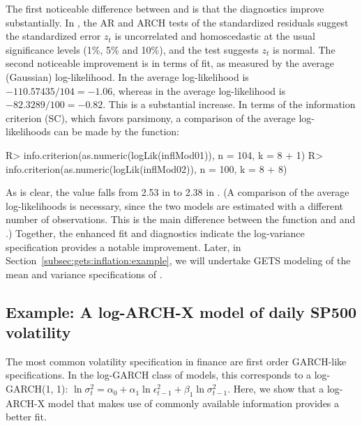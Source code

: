 \documentclass[article,nojss]{jss}
\begin{document}
%
The first noticeable difference between  and
 is that the diagnostics improve substantially. In
, the AR and ARCH tests of the standardized residuals
suggest the standardized error $z_t$ is uncorrelated and homoscedastic
at the usual significance levels (1\%, 5\% and 10\%), and the
\cite{JarqueBera1980} test suggests $z_t$ is normal. The second
noticeable improvement is in terms of fit, as measured by the average
(Gaussian) log-likelihood. In  the average
log-likelihood is $-110.57435/104= -1.06$, whereas in 
the average log-likelihood is $-82.3289/100= -0.82$. This is a
substantial increase. In terms of the \cite{Schwarz1978} information
criterion (SC), which favors parsimony, a comparison of the average
log-likelihoods can be made by the  function:
%
\begin{CodeChunk}
\begin{CodeInput}
R> info.criterion(as.numeric(logLik(inflMod01)), n = 104, k = 8 + 1)
R> info.criterion(as.numeric(logLik(inflMod02)), n = 100, k = 8 + 8)
\end{CodeInput}
\end{CodeChunk}
%
As is clear, the value falls from 2.53 in  to 2.38 in
. (A comparison of the average log-likelihoods is
necessary, since the two models are estimated with a different number
of observations. This is the main difference between the
 function and  and .)
Together, the enhanced fit and diagnostics indicate the log-variance
specification provides a notable improvement. Later, in
Section~\ref{subsec:gets:inflation:example}, we will undertake GETS
modeling of the mean and variance specifications of .

\subsection{Example: A log-ARCH-X model of daily SP500 volatility}
\label{subsec:arx:example:sp500-volatility}

The most common volatility specification in finance are first order
GARCH-like specifications. In the log-GARCH class of models, this
corresponds to a log-GARCH(1, 1):
$\ln\sigma_t^2 = \alpha_0 + \alpha_1\ln\epsilon_{t-1}^2 +
\beta_1\ln\sigma_{t-1}^2$. Here, we show that a log-ARCH-X model that
makes use of commonly available information provides a better fit.
\end{document}
